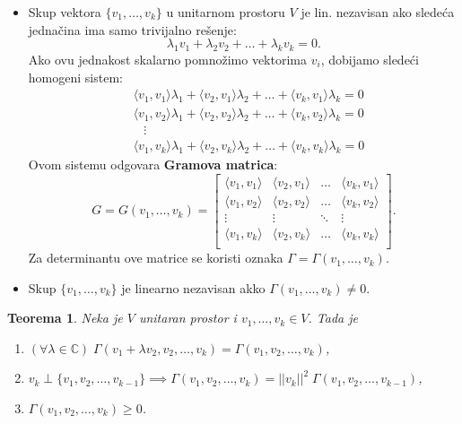 \documentclass[a4paper,12pt,twoside]{report}
\newtheorem{theorem}{Teorema}[section]
\numberwithin{algorithm}{section}
\begin{document}
\begin{itemize}
    \item Skup vektora $\{v_1, \dots, v_k\}$ u unitarnom prostoru $V$ je lin. nezavisan ako sledeća jednačina ima samo trivijalno rešenje:
    \[ \lambda_1v_1 + \lambda_2v_2 + \dots + \lambda_kv_k = 0. \] Ako ovu jednakost skalarno pomnožimo vektorima $v_i$, dobijamo 
    sledeći homogeni sistem:
    \[
        \begin{aligned}
            &\langle v_1, v_1 \rangle \lambda_1 + \langle v_2, v_1 \rangle \lambda_2 +  \dots + \langle v_k, v_1 \rangle \lambda_k = 0 \\
            &\langle v_1, v_2 \rangle \lambda_1 + \langle v_2, v_2 \rangle \lambda_2 +  \dots + \langle v_k, v_2 \rangle \lambda_k = 0 \\
            &\;\;\;\vdots \\
            &\langle v_1, v_k \rangle \lambda_1 + \langle v_2, v_k \rangle \lambda_2 + \dots + \langle v_k, v_k \rangle \lambda_k = 0
        \end{aligned}
    \]
    Ovom sistemu odgovara \textbf{Gramova matrica}:
    \[ G = G(v_1, \dots, v_k) = \begin{bmatrix}
        \langle v_1, v_1 \rangle & \langle v_2, v_1 \rangle & \dots & \langle v_k, v_1 \rangle \\
        \langle v_1, v_2 \rangle & \langle v_2, v_2 \rangle & \dots & \langle v_k, v_2 \rangle \\
        \vdots & \vdots & \ddots & \vdots \\
        \langle v_1, v_k \rangle & \langle v_2, v_k \rangle & \dots & \langle v_k, v_k \rangle \\
    \end{bmatrix}.\]
    Za determinantu ove matrice se koristi oznaka $\Gamma = \Gamma (v_1, \dots, v_k)$.
    \item Skup $\{v_1, \dots, v_k\}$ je linearno nezavisan akko $\Gamma (v_1, \dots, v_k) \neq 0$.
\end{itemize}

\begin{theorem}
    Neka je $V$ unitaran prostor i $v_1, \dots, v_k \in V$. Tada je
    \begin{enumerate}
        \item $(\forall \lambda \in \mathbb{C})\;\Gamma(v_1 + \lambda v_2, v_2, \dots, v_k) = \Gamma (v_1, v_2,\dots, v_k) $,
        \item $v_k \perp \{ v_1, v_2, \dots, v_{k-1} \} \implies \Gamma (v_1, v_2, \dots, v_k) = ||v_k||^2\; \Gamma (v_1, v_2, \dots, v_{k-1})$,
        \item $\Gamma (v_1, v_2, \dots, v_k) \geq 0$.
    \end{enumerate}
\end{theorem}
\end{document}
